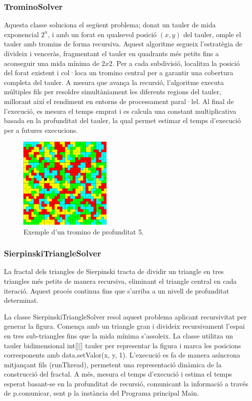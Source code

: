 \documentclass{ieeetj}
\begin{document}
\subsubsection{TrominoSolver}
Aquesta classe soluciona el següent problema; donat un tauler de mida exponencial \(2^n\), i amb un forat en qualsevol posició \((x,y)\) del tauler, omple el tauler amb tromins de forma recursiva.
Aquest algoritme segueix l'estratègia de divideix i venceràs, fragmentant el tauler en quadrants més petits fins a aconseguir una mida mínima de \(2x2\). Per a cada subdivisió, localitza la posició del forat existent i col·loca un tromino central per a garantir una cobertura completa del tauler. A mesura que avança la recursió, l'algoritme executa múltiples fils per resoldre simultàniament les diferents regions del tauler, millorant així el rendiment en entorns de processament paral·lel. Al final de l'execució, es mesura el temps emprat i es calcula una constant multiplicativa basada en la profunditat del tauler, la qual permet estimar el temps d'execució per a futures execucions.

\begin{figure}[htbp]
\centerline{\includegraphics[width=0.4\textwidth]{docs/png/FiguraTromino5.png}}
\caption{Exemple d'un tromino de profunditat 5.}
\label{fig:int2}
\end{figure}

\subsubsection{SierpinskiTriangleSolver}
La fractal dels triangles de Sierpinski tracta de dividir un triangle en tres triangles més petits de manera recursiva, eliminant el triangle central en cada iteració. Aquest procés continua fins que s'arriba a un nivell de profunditat determinat.

La classe SierpinskiTriangleSolver resol aquest problema aplicant recursivitat per generar la figura. Comença amb un triangle gran i divideix recursivament l'espai en tres sub-triangles fins que la mida mínima s'assoleix. La classe utilitza un tauler bidimensional int[][] tauler per representar la figura i marca les posicions corresponents amb data.setValor(x, y, 1). L'execució es fa de manera asíncrona mitjançant fils (runThread), permetent una representació dinàmica de la construcció del fractal. A més, mesura el temps d'execució i estima el temps esperat basant-se en la profunditat de recursió, comunicant la informació a través de p.comunicar, sent p la instància del Programa principal Main.
\end{document}
